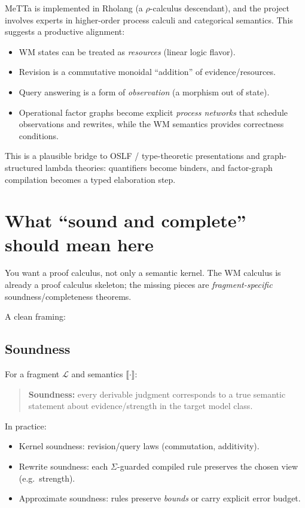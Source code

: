 \documentclass[11pt]{article}
\begin{document}
MeTTa is implemented in Rholang (a $\rho$-calculus descendant), and the project involves
experts in higher-order process calculi and categorical semantics.
This suggests a productive alignment:

\begin{itemize}[leftmargin=2em]
\item WM states can be treated as \emph{resources} (linear logic flavor).
\item Revision is a commutative monoidal ``addition'' of evidence/resources.
\item Query answering is a form of \emph{observation} (a morphism out of state).
\item Operational factor graphs become explicit \emph{process networks} that schedule observations
and rewrites, while the WM semantics provides correctness conditions.
\end{itemize}

This is a plausible bridge to OSLF / type-theoretic presentations and graph-structured lambda theories:
quantifiers become binders, and factor-graph compilation becomes a typed elaboration step.

\section{What ``sound and complete'' should mean here}

You want a proof calculus, not only a semantic kernel.
The WM calculus is already a proof calculus skeleton; the missing pieces are \emph{fragment-specific}
soundness/completeness theorems.

A clean framing:

\subsection{Soundness}

For a fragment $\mathcal{L}$ and semantics $\llbracket\cdot\rrbracket$:
\begin{quote}
\textbf{Soundness:} every derivable judgment corresponds to a true semantic statement
about evidence/strength in the target model class.
\end{quote}

In practice:
\begin{itemize}[leftmargin=2em]
\item Kernel soundness: revision/query laws (commutation, additivity).
\item Rewrite soundness: each $\Sigma$-guarded compiled rule preserves the chosen view (e.g.\ strength).
\item Approximate soundness: rules preserve \emph{bounds} or carry explicit error budget.
\end{itemize}
\end{document}
